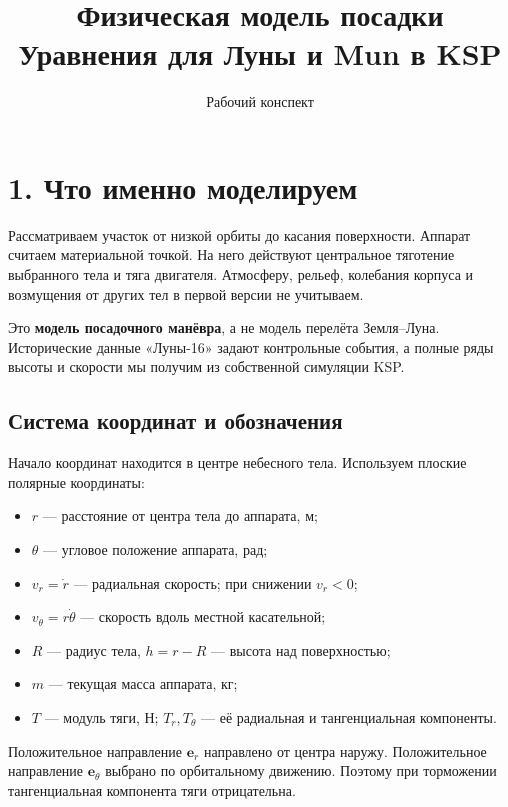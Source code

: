 \documentclass[11pt,a4paper]{article}
\title{\textbf{\color{navy}Физическая модель посадки}\\[3pt]\large Уравнения для Луны и Mun в KSP}
\author{Рабочий конспект}
\date{}
\newcommand{\er}{\mathbf e_r}
\newcommand{\etheta}{\mathbf e_\theta}
\begin{document}
\maketitle
\vspace{-1.1cm}
\begin{center}
\end{center}

\section{1. Что именно моделируем}
Рассматриваем участок от низкой орбиты до касания поверхности. Аппарат считаем материальной точкой. На него действуют центральное тяготение выбранного тела и тяга двигателя. Атмосферу, рельеф, колебания корпуса и возмущения от других тел в первой версии не учитываем.

Это \textbf{модель посадочного манёвра}, а не модель перелёта Земля--Луна. Исторические данные «Луны-16» задают контрольные события, а полные ряды высоты и скорости мы получим из собственной симуляции KSP.

\subsection*{Система координат и обозначения}
Начало координат находится в центре небесного тела. Используем плоские полярные координаты:
\begin{itemize}
\item $r$ --- расстояние от центра тела до аппарата, м;
\item $\theta$ --- угловое положение аппарата, рад;
\item $v_r=\dot r$ --- радиальная скорость; при снижении $v_r<0$;
\item $v_\theta=r\dot\theta$ --- скорость вдоль местной касательной;
\item $R$ --- радиус тела, $h=r-R$ --- высота над поверхностью;
\item $m$ --- текущая масса аппарата, кг;
\item $T$ --- модуль тяги, Н; $T_r,T_\theta$ --- её радиальная и тангенциальная компоненты.
\end{itemize}
Положительное направление $\er$ направлено от центра наружу. Положительное направление $\etheta$ выбрано по орбитальному движению. Поэтому при торможении тангенциальная компонента тяги отрицательна.
\end{document}
